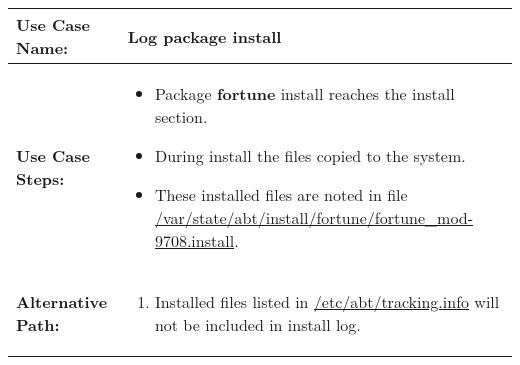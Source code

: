 \medskip

\begin{tabularx}{\linewidth}{|l|X|}
\hline
\textbf{Use Case Name:} & \textbf{Log package install} \\
\hline
\textbf{Use Case Steps:} & 
\begin{minipage}{\linewidth} 
  \vspace{0.05em}
  \begin{itemize}
    \item Package \textbf{fortune} install reaches the install section.
    \item During install the files copied to the system.
    \item These installed files are noted in file \url{/var/state/abt/install/fortune/fortune_mod-9708.install}.
  \end{itemize}
  \vspace{0.05em}
\end{minipage}
\\
\hline 
\textbf{Alternative Path:} &
\begin{minipage}{\linewidth}
  \vspace{0.05em} 
  \begin{enumerate}
    \item Installed files listed in \url{/etc/abt/tracking.info} will not be included in install log.
  \end{enumerate}
  \vspace{0.05em} 
\end{minipage}
\\
\hline
\end{tabularx}